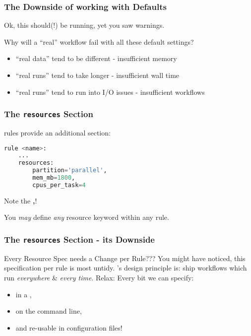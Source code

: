 \begin{frame}
  \frametitle{The Downside of working with Defaults}
  Ok, this should(!) be running, yet you saw warnings. 
  \begin{question}
  	Why will a ``real'' workflow fail with all these default settings?
  \end{question}
  \pause
  \begin{itemize}
   \item ``real data'' tend to be different - insufficient memory
   \item ``real runs'' tend to take longer - insufficient wall time
   \item ``real runs'' tend to run into I/O issues - insufficient workflows
  \end{itemize}
\end{frame}


\begin{frame}[fragile]
	\frametitle{The \Snakemake{} \texttt{resources} Section}
	\Snakemake{} rules provide an additional  section:
	\begin{lstlisting}[language=Python,style=Python]
rule <name>:
	...
	resources:
		partition='parallel',
		mem_mb=1800,
		cpus_per_task=4
	\end{lstlisting}
	\begin{hint}
		Note the \textbf{,}!
	\end{hint}
	\pause
	\begin{docs}
		You \emph{may} define \emph{any} resource keyword within any rule.
	\end{docs}
\end{frame}

\begin{frame}
	\frametitle{The \Snakemake{} \texttt{resources} Section - its Downside}
	\begin{block}{Every Resource Spec needs a Change per Rule???}
		You might have noticed, this specification per rule is most untidy. \Snakemake's design principle is: ship workflows which run \emph{everywhere} \& \emph{every time}.
		\newline \pause
		Relax: Every bit we can specify:
		\begin{itemize}
			\item in a ,
			\item on the command line,
			\item and re-usable in configuration files!
		\end{itemize}
	\end{block}
\end{frame} 

